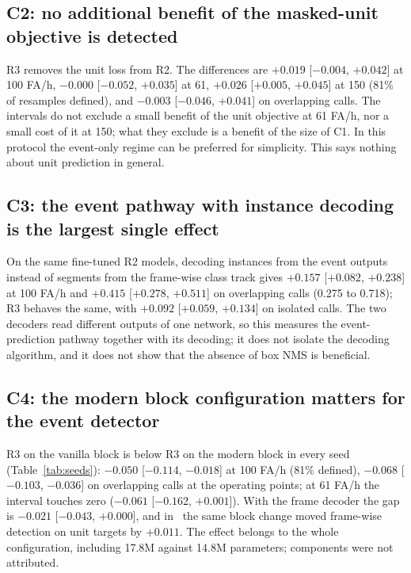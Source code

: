 \documentclass[10pt,twocolumn]{article}
\begin{document}
\subsection{C2: no additional benefit of the masked-unit objective is detected}
R3 removes the unit loss from R2. The differences are $+0.019$ [$-0.004$, $+0.042$] at 100 FA/h, $-0.000$ [$-0.052$, $+0.035$] at 61, $+0.026$ [$+0.005$, $+0.045$] at 150 (81\% of resamples defined), and $-0.003$ [$-0.046$, $+0.041$] on overlapping calls. The intervals do not exclude a small benefit of the unit objective at 61 FA/h, nor a small cost of it at 150; what they exclude is a benefit of the size of C1. In this protocol the event-only regime can be preferred for simplicity. This says nothing about unit prediction in general.

\subsection{C3: the event pathway with instance decoding is the largest single effect}
On the same fine-tuned R2 models, decoding instances from the event outputs instead of segments from the frame-wise class track gives $+0.157$ [$+0.082$, $+0.238$] at 100 FA/h and $+0.415$ [$+0.278$, $+0.511$] on overlapping calls (0.275 to 0.718); R3 behaves the same, with $+0.092$ [$+0.059$, $+0.134$] on isolated calls. The two decoders read different outputs of one network, so this measures the event-prediction pathway together with its decoding; it does not isolate the decoding algorithm, and it does not show that the absence of box NMS is beneficial.

\subsection{C4: the modern block configuration matters for the event detector}
R3 on the vanilla block is below R3 on the modern block in every seed (Table~\ref{tab:seeds}): $-0.050$ [$-0.114$, $-0.018$] at 100 FA/h (81\% defined), $-0.068$ [$-0.103$, $-0.036$] on overlapping calls at the operating points; at 61 FA/h the interval touches zero ($-0.061$ [$-0.162$, $+0.001$]). With the frame decoder the gap is $-0.021$ [$-0.043$, $+0.000$], and in~\citep{sheipak2026what} the same block change moved frame-wise detection on unit targets by $+0.011$. The effect belongs to the whole configuration, including 17.8M against 14.8M parameters; components were not attributed.
\end{document}
